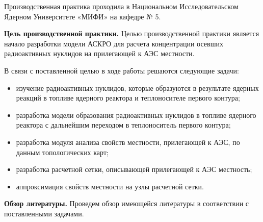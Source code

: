 

Производственная практика проходила в Национальном Исследовательском Ядерном Университете «МИФИ» на кафедре № 5. 

\textbf{Цель производственной практики.} Целью производственной практики является начало разработки модели АСКРО для
	расчета концентрации осевших радиоактивных нуклидов на прилегающей к АЭС местности.

В связи с поставленной целью в ходе работы решаются следующие задачи:

\begin{itemize}
	\item изучение радиоактивных нуклидов, которые образуются в результате ядерных реакций в топливе ядерного реактора 
		и теплоносителе первого контура;
	\item разработка модели образования радиоактивных нуклидов в топливе ядерного реактора с дальнейшим переходом в
		теплоноситель первого контура;
	\item разработка модуля анализа свойств местности, прилегающей к АЭС, по данным топологических карт;
	\item разработка расчетной сетки, описывающей прилегающей к АЭС местность;
	\item аппроксимация свойств местности на узлы расчетной сетки.
\end{itemize}

\textbf{Обзор литературы.} Проведем обзор имеющейся литературы в соответствии с поставленными задачами.